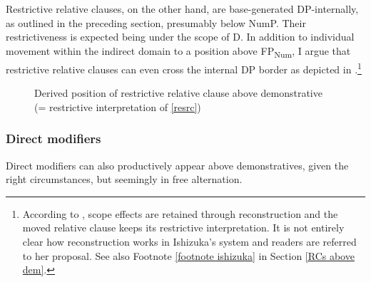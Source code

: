 Restrictive relative clauses, on the other hand, are base-generated DP-internal\-ly, as outlined in the preceding section, presumably below NumP. Their restrictiveness is expected being under the scope of D. In addition to individual movement within the indirect domain to a position above FP\textsubscript{Num}, I argue that restrictive relative clauses can even cross the internal DP border as depicted in .\footnote{According to \citet{ishizuka:2008:RC}, scope effects are retained through reconstruction and the moved relative clause keeps its restrictive interpretation. It is not entirely clear how reconstruction works in Ishizuka's system and readers are referred to her proposal. See also Footnote \ref{footnote ishizuka} in Section \ref{RCs above dem}.}

\begin{figure}
\centering
{}
\caption{Derived position of restrictive relative clause above demonstrative (= restrictive interpretation of \ref{resrc})}
\label{Restrictive Rc above demonstrative}
\end{figure}


\subsubsection{Direct modifiers }

Direct modifiers can also productively appear above demonstratives, given the right circumstances, but seemingly in free alternation. 

